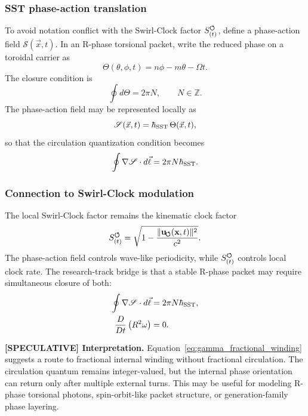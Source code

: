 \subsubsection{SST phase-action translation}
To avoid notation conflict with the Swirl-Clock factor $S_{(t)}^{\boldsymbol{\circlearrowleft}}$, define a phase-action field $\mathscr S(\vec x,t)$. In an R-phase torsional packet, write the reduced phase on a toroidal carrier as
\begin{equation}
    \Theta(\theta,\phi,t)
    = n\phi-m\theta-\Omega t.
    \label{eq:sst_torus_phase}
\end{equation}
The closure condition is
\begin{equation}
    \oint d\Theta = 2\pi N,
    \qquad N\in\mathbb Z.
    \label{eq:phase_closure_condition}
\end{equation}
The phase-action field may be represented locally as
\begin{equation}
    \mathscr S(\vec x,t)=\hbar_{\rm SST}\,\Theta(\vec x,t),
    \label{eq:phase_action_relation}
\end{equation}
so that the circulation quantization condition becomes
\begin{equation}
    \oint \nabla\mathscr S\cdot d\vec\ell
    =2\pi N\hbar_{\rm SST}.
    \label{eq:phase_action_quantization}
\end{equation}

\subsubsection{Connection to Swirl-Clock modulation}
The local Swirl-Clock factor remains the kinematic clock factor
\begin{equation}
    S_{(t)}^{\boldsymbol{\circlearrowleft}}
    =\sqrt{1-\frac{\lVert\mathbf{u}_{\!\boldsymbol{\circlearrowleft}}(\mathbf{x},t)\rVert^2}{c^2}}.
    \label{eq:swirl_clock_factor_appendix}
\end{equation}
The phase-action field controls wave-like periodicity, while $S_{(t)}^{\boldsymbol{\circlearrowleft}}$ controls local clock rate. The research-track bridge is that a stable R-phase packet may require simultaneous closure of both:
\begin{align}
    \oint \nabla\mathscr S\cdot d\vec\ell &=2\pi N\hbar_{\rm SST},\label{eq:phase_closure}\\
    \frac{D}{Dt}\left(R^2\omega\right)&=0.\label{eq:kelvin_closure}
\end{align}

\textbf{[SPECULATIVE] Interpretation.}
Equation~\eqref{eq:gamma_fractional_winding} suggests a route to fractional internal winding without fractional circulation. The circulation quantum remains integer-valued, but the internal phase orientation can return only after multiple external turns. This may be useful for modeling R-phase torsional photons, spin-orbit-like packet structure, or generation-family phase layering.

